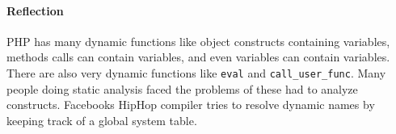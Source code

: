 \documentclass[../main.tex]{subfiles}
\begin{document}
\paragraph{Reflection}
\label{reflection}
PHP has many dynamic functions like object constructs containing variables, methods calls can contain variables, and even variables can contain variables.
There are also very dynamic functions like \texttt{eval} and \texttt{call\_user\_func}.
Many people doing static analysis faced the problems of these had to analyze constructs.
Facebooks HipHop compiler \autocite{Zha:12} tries to resolve dynamic names by keeping track of a global system table.
\end{document}
